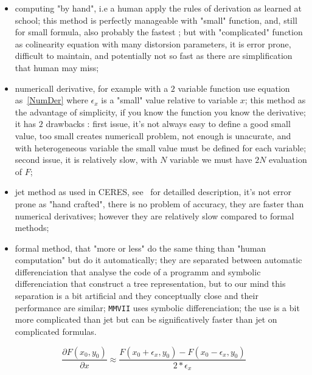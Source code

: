 \begin{itemize}
    \item  computing "by hand", i.e a human apply the rules of derivation as
           learned at school;  this method is perfectly manageable with "small"
           function, and, still for small formula, also probably the fastest ;
           but with "complicated" function as colinearity equation with many distorsion parameters,
           it is error prone, difficult to maintain, and potentially not so fast as there
           are simplification that human may miss;

    \item  numericall derivative, for example with a $2$ variable function use equation as~\ref{NumDer}
           where $\epsilon_x$ is a "small" value relative to variable $x$;
           this method as the advantage of simplicity, if you know the function you know the derivative;
           it has $2$ drawbacks :  first issue, it's not always easy to define a good small value,  too small
           creates numericall problem, not enough is unacurate, and with heterogeneous variable the small
            value must be defined for each variable;  second issue, it is relatively slow, with $N$  variable
           we must have $2N$ evaluation of $F$;

     \item jet method as used in CERES, see~\cite{CERES} for detailled description, it's not error
           prone as "hand crafted", there is no problem of accuracy, they are faster than 
           numerical derivatives; however they are relatively slow compared to formal methods;

     \item formal method, that "more or less" do the same thing than "human computation" but do
           it automatically; they are separated between automatic differenciation that analyse the code of a programm
           and symbolic differenciation that construct a tree representation, but to our mind this separation
           is a bit artificial and they conceptually close and 
		their performance are similar;  {\tt MMVII} uses symbolic differenciation;
           the use is a bit more complicated than jet but can be significatively faster  than jet on complicated
           formulas.
\end{itemize}

\begin{equation}
    \frac{\partial F(x_0,y_0)}{\partial x} \approx \frac{F(x_0 + \epsilon_x,y_0) - F(x_0-\epsilon_x,y_0)}{2* \epsilon_x}
     \label{NumDer}
\end{equation}

